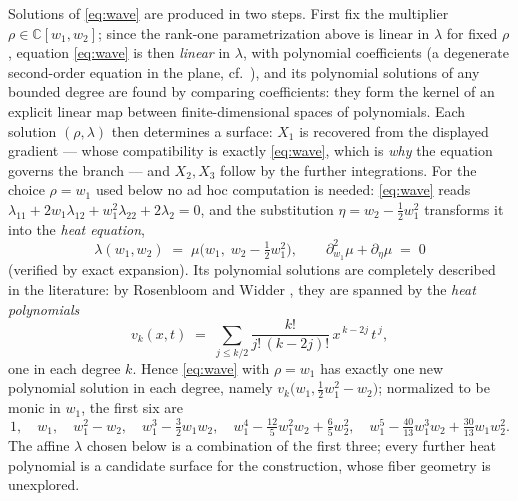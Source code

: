 \documentclass[11pt]{article}
\theoremstyle{plain}
\theoremstyle{definition}
\theoremstyle{remark}
\newcommand{\C}{\mathbb{C}}
\begin{document}
Solutions of \eqref{eq:wave} are produced in two steps. First fix the
multiplier $\rho\in\C[w_1,w_2]$; since the rank-one parametrization above is
linear in $\lambda$ for fixed $\rho$, equation \eqref{eq:wave} is then
\emph{linear} in $\lambda$, with polynomial coefficients (a degenerate
second-order equation in the plane, cf.\ \cite{CourantHilbert1962}), and its
polynomial solutions of any bounded degree are found by comparing
coefficients: they form the kernel of an explicit linear map between
finite-dimensional spaces of polynomials. Each solution $(\rho,\lambda)$ then
determines a surface: $X_1$ is recovered from the displayed gradient ---
whose compatibility is exactly \eqref{eq:wave}, which is \emph{why} the
equation governs the branch --- and $X_2,X_3$ follow by the further
integrations. For the choice $\rho=w_1$ used below no ad hoc computation is
needed: \eqref{eq:wave} reads
$\lambda_{11}+2w_1\lambda_{12}+w_1^2\lambda_{22}+2\lambda_2=0$, and the
substitution $\eta=w_2-\tfrac12w_1^2$ transforms it into the \emph{heat
equation},
\[
\lambda(w_1,w_2)\;=\;\mu\bigl(w_1,\;w_2-\tfrac12w_1^2\bigr),
\qquad
\partial_{w_1}^{2}\mu+\partial_\eta\mu\;=\;0
\]
(verified by exact expansion). Its polynomial solutions are completely
described in the literature: by Rosenbloom and Widder
\cite{RosenbloomWidder1959}, they are spanned by the \emph{heat polynomials}
\[
v_k(x,t)\;=\;\sum_{j\le k/2}\frac{k!}{j!\,(k-2j)!}\,x^{\,k-2j}\,t^{\,j},
\]
one in each degree $k$. Hence \eqref{eq:wave} with $\rho=w_1$ has exactly one
new polynomial solution in each degree, namely
$v_k\bigl(w_1,\tfrac12w_1^2-w_2\bigr)$; normalized to be monic in $w_1$, the
first six are
\[
1,\quad w_1,\quad w_1^2-w_2,\quad w_1^3-\tfrac32w_1w_2,\quad
w_1^4-\tfrac{12}5w_1^2w_2+\tfrac65w_2^2,\quad
w_1^5-\tfrac{40}{13}w_1^3w_2+\tfrac{30}{13}w_1w_2^2 .
\]
The affine $\lambda$ chosen below is a combination of the first three; every
further heat polynomial is a candidate surface for the construction, whose
fiber geometry is unexplored.
\end{document}
